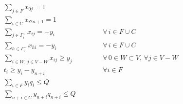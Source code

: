 \documentclass[12pt]{article}
\begin{document}
\begin{eqnarray}
\label{eq01}
  \sum\limits_{j \in F} {x_{0j}} = 1 \\
\label{eq02}
  \sum\limits_{i \in C} {x_{i2n+1}} = 1 \\
\label{eq03}
  \sum\limits_{j \in \Gamma^+_i} {x_{ij}} = -y_i & \hspace{1cm} &\forall \, i \in F \cup C\\
\label{eq04}
  \sum\limits_{h \in \Gamma^-_i} {x_{hi}} = -y_i & \hspace{1cm} &\forall \, i \in F \cup C\\
\label{eq05}
  \sum\limits_{i \in W, \, j \in V-W}{x_{ij}} \ge y_j  & \hspace{1cm} &\forall \, 0 \in W \subset V, \, \forall j \in V-W \\
\label{eq06}
  t_i \ge y_i - y_{n+i} & \hspace{1cm} &\forall i \in F \\
\label{eq07}
  \sum\limits_{i \in F} {y_i q_i} \le Q \\
\label{eq08}
  \sum\limits_{n+i \in C} {y_{n+i} q_{n+i}} \le Q \\
\end{eqnarray}
\end{document}
